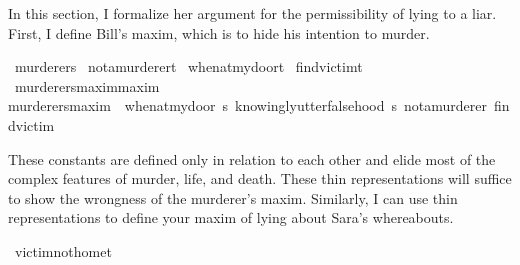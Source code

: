 \begin{isabellebody}
\begin{isamarkuptext}
In this section, I formalize her argument for the permissibility of lying to a liar. First, I define
Bill's maxim, which is to hide his intention to murder.%
\end{isamarkuptext}\isamarkuptrue%
\isamarkupfalse%
\ murderer{\isacharcolon}{\isacharcolon}s\isanewline
%
\isanewline
{}\isamarkupfalse%
\ not{\isacharunderscore}a{\isacharunderscore}murderer{\isacharcolon}{\isacharcolon}t\isanewline
%
\isanewline
{}\isamarkupfalse%
\ when{\isacharunderscore}at{\isacharunderscore}my{\isacharunderscore}door{\isacharcolon}{\isacharcolon}t\isanewline
%
\isanewline
{}\isamarkupfalse%
\ find{\isacharunderscore}victim{\isacharcolon}{\isacharcolon}t\isanewline
%
\isanewline
{}\isamarkupfalse%
\ murderers{\isacharunderscore}maxim{\isacharcolon}{\isacharcolon}{\isachardoublequoteopen}maxim{\isachardoublequoteclose}\ \ \isanewline
{\isachardoublequoteopen}murderers{\isacharunderscore}maxim\ {\isasymequiv}\ {\isacharparenleft}when{\isacharunderscore}at{\isacharunderscore}my{\isacharunderscore}door{\isacharcomma}\ {\isasymlambda}s{\isachardot}\ knowingly{\isacharunderscore}utter{\isacharunderscore}falsehood\ s\ not{\isacharunderscore}a{\isacharunderscore}murderer{\isacharcomma}\ find{\isacharunderscore}victim{\isacharparenright}{\isachardoublequoteclose}\isanewline
%
%
\begin{isamarkuptext}%
These constants are defined only in relation to each other and elide most of the complex features
of murder, life, and death. These thin representations will suffice to show
the wrongness of the murderer's maxim. Similarly, I can use thin representations to define your
maxim of lying about Sara's whereabouts.%
\end{isamarkuptext}\isamarkuptrue%
\isamarkupfalse%
\ victim{\isacharunderscore}not{\isacharunderscore}home{\isacharcolon}{\isacharcolon}t\isanewline

\end{isabellebody}
